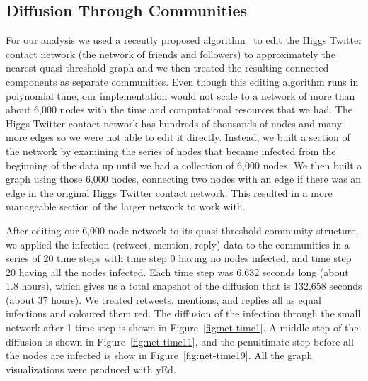 \documentclass[12pt, oneside, openany]{article} %
\begin{document}
\subsection{Diffusion Through Communities}
For our analysis we used a recently proposed algorithm~\cite{brandes} to edit the Higgs Twitter contact network (the network of friends and followers) to approximately the nearest quasi-threshold graph and we then treated the resulting connected components as separate communities. Even though this editing algorithm runs in polynomial time, our implementation would not scale to a network of more than about 6,000 nodes with the time and computational resources that we had. The Higgs Twitter contact network has hundreds of thousands of nodes and many more edges so we were not able to edit it directly. Instead, we built a section of the network by examining the series of nodes that became infected from the beginning of the data up until we had a collection of 6,000 nodes. We then built a graph using those 6,000 nodes, connecting two nodes with an edge if there was an edge in the original Higgs Twitter contact network. This resulted in a more manageable section of the larger network to work with.

After editing our 6,000 node network to its quasi-threshold community structure, we applied the infection (retweet, mention, reply) data to the communities in a series of 20 time steps with time step 0 having no nodes infected, and time step 20 having all the nodes infected. Each time step was 6,632 seconds long (about 1.8 hours), which gives us a total snapshot of the diffusion that is 132,658 seconds (about 37 hours). We treated retweets, mentions, and replies all as equal infections and coloured them red. The diffusion of the infection through the small network after 1 time step is shown in Figure~\ref{fig:net-time1}. A middle step of the diffusion is shown in Figure~\ref{fig:net-time11}, and the penultimate step before all the nodes are infected is show in Figure~\ref{fig:net-time19}. All the graph visualizations were produced with yEd.
\end{document}
